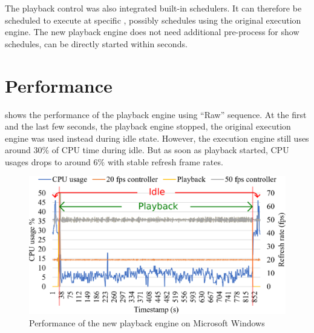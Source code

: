 The playback control was also integrated  built-in schedulers. It can therefore be scheduled to execute at specific , possibly  schedules using the original execution engine. The new playback engine does not need additional pre-process for show schedules,  can be directly started within seconds.

\section{Performance}

 shows the performance of the  playback engine  using  ``Raw'' sequence. At the first and the last few seconds, the playback engine stopped, the original execution engine was used instead during idle state. However, the execution engine still uses around $30 \%$ of CPU time during idle. But as soon as playback started, CPU usages drops to around $6 \%$ with stable refresh frame rates.

\begin{figure}[t]
  \centering
  \includegraphics[width=0.8\columnwidth]{Figs/playback.eps}
  \caption{\footnotesize Performance of the new playback engine on Microsoft Windows}
  \label{fig:playback}
\end{figure}
